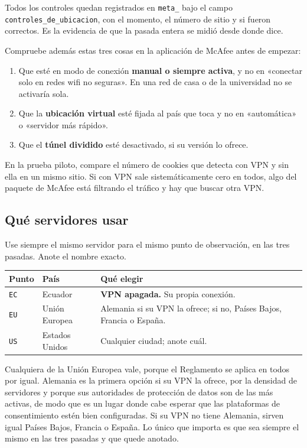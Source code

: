 \documentclass[11pt,a4paper]{article}
\begin{document}
Todos los controles quedan registrados en \texttt{meta\_} bajo el campo \texttt{controles\_de\_ubicacion}, con el momento, el número de sitio y si fueron correctos. Es la evidencia de que la pasada entera se midió desde donde dice.

\begin{aviso}
	Compruebe además estas tres cosas en la aplicación de McAfee antes de empezar:
	\begin{enumerate}
		\item Que esté en modo de conexión \textbf{manual o siempre activa}, y no en «conectar solo en redes wifi no seguras». En una red de casa o de la universidad no se activaría sola.
		\item Que la \textbf{ubicación virtual} esté fijada al país que toca y no en «automática» o «servidor más rápido».
		\item Que el \textbf{túnel dividido} esté desactivado, si su versión lo ofrece.
	\end{enumerate}
	En la prueba piloto, compare el número de cookies que detecta con VPN y sin ella en un mismo sitio. Si con VPN sale sistemáticamente cero en todos, algo del paquete de McAfee está filtrando el tráfico y hay que buscar otra VPN.
\end{aviso}

\subsection{Qué servidores usar}

Use siempre el mismo servidor para el mismo punto de observación, en las tres pasadas. Anote el nombre exacto.

\begin{center}
	\begin{tabular}{@{}l l >{\RaggedRight\arraybackslash}p{7.4cm}@{}}
		\toprule
		\textbf{Punto} & \textbf{País} & \textbf{Qué elegir} \\
		\midrule
		\texttt{EC} & Ecuador & \textbf{VPN apagada.} Su propia conexión. \\
		\texttt{EU} & Unión Europea & Alemania si su VPN la ofrece; si no, Países Bajos, Francia o España. \\
		\texttt{US} & Estados Unidos & Cualquier ciudad; anote cuál. \\
		\bottomrule
	\end{tabular}
\end{center}

\begin{nota}
	Cualquiera de la Unión Europea vale, porque el Reglamento se aplica en todos por igual. Alemania es la primera opción si su VPN la ofrece, por la densidad de servidores y porque sus autoridades de protección de datos son de las más activas, de modo que es un lugar donde cabe esperar que las plataformas de consentimiento estén bien configuradas. Si su VPN no tiene Alemania, sirven igual Países Bajos, Francia o España. Lo único que importa es que sea siempre el mismo en las tres pasadas y que quede anotado.
\end{nota}
\end{document}

